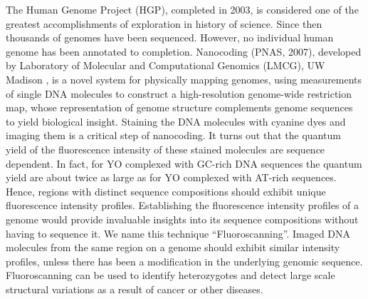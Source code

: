 %
%
%

\noindent       %
The Human Genome Project (HGP), completed in 2003, is considered one of the greatest accomplishments of exploration in history of science. Since then thousands of genomes have been sequenced. However, no individual human genome has been annotated to completion. Nanocoding \cite{Jo_etal_2007_PNAS} (PNAS, 2007), developed by Laboratory of Molecular and Computational Genomics (LMCG), UW Madison , is a novel system for physically mapping genomes, using measurements of single DNA molecules to construct a high-resolution genome-wide restriction map, whose representation of genome structure complements genome sequences to yield biological insight. Staining the DNA molecules with cyanine dyes and imaging them is a critical step of nanocoding. It turns out that the quantum yield of the fluorescence intensity of these stained molecules are sequence dependent. In fact, for YO complexed with GC-rich DNA sequences the quantum yield are about twice as large as for YO complexed with AT-rich sequences. Hence, regions with distinct sequence compositions should exhibit unique fluorescence intensity profiles. Establishing the fluorescence intensity profiles of a genome would provide invaluable insights into its sequence compositions without having to sequence it. We name this technique ``Fluoroscanning''. Imaged DNA molecules from the same region on a genome should exhibit similar intensity profiles, unless there has been a modification in the underlying genomic sequence. Fluoroscanning can be used to identify heterozygotes and detect large scale structural variations as a result of cancer or other diseases.  


